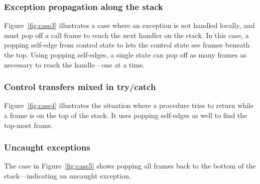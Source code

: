 \subsubsection{Exception propagation along the stack}

Figure~\ref{fig:case3} illustrates a case where 
an exception is not handled locally, and must pop off a 
call frame to reach the next handler on the stack.
In this case,
a popping self-edge from control state  to  
lets the control state  see frames beneath the top.
Using popping self-edges, a single state can pop off as many frames as necessary 
to reach the handle---one at a time.




\subsubsection{Control transfers mixed in try/catch}

Figure~\ref{fig:case4} illustrates the situation where a procedure tries to
return while a  frame is on the top of the stack.
It uses popping self-edges as well to find the top-most  frame.



\subsubsection{Uncaught exceptions}
The case in Figure~\ref{fig:case5} 
shows popping all frames back to  
the bottom of the stack---indicating an uncaught exception.





\begin{figure*}
\centering
\begin{minipage}{0.4\linewidth}

\caption{Intraprocedural handler push/pop}
\label{fig:case1}
\end{minipage}\begin{minipage}{0.5\linewidth}

\caption{Locally caught exceptions}
\label{fig:case2}
\end{minipage}
\begin{minipage}{0.5\linewidth}

\caption{Exception propagation}
\label{fig:case3}
\end{minipage}\begin{minipage}{0.5\linewidth}

\caption{Control transfers mixed in try/catch}
\label{fig:case4}
\end{minipage}
\begin{minipage}{0.5\linewidth}

\caption{Uncaught exceptions}
\label{fig:case5}
\end{minipage}
\end{figure*}



